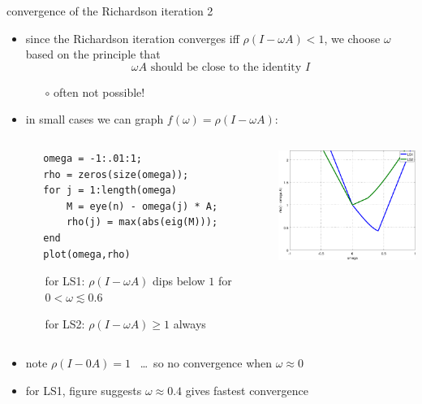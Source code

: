 \documentclass[10pt,hyperref]{beamer}
\begin{document}
\begin{frame}[fragile]{convergence of the Richardson iteration 2}

\begin{itemize}
\item since the Richardson iteration converges iff $\rho(I - \omega A)<1$, we choose $\omega$ based on the principle that
    $$\omega A \text{ should be close to the identity } I$$
\vspace{-5mm}
  \begin{itemize}
  \item[$\circ$] often not possible!
  \end{itemize}

\medskip
\item in small cases we can graph $f(\omega) = \rho(I-\omega A)$:

\medskip
\begin{columns}
\begin{column}{0.5\textwidth}
\footnotesize
\begin{verbatim}
   omega = -1:.01:1;
   rho = zeros(size(omega));
   for j = 1:length(omega)
       M = eye(n) - omega(j) * A;
       rho(j) = max(abs(eig(M)));
   end
   plot(omega,rho)
\end{verbatim}

\smallskip
\begin{itemize}
\footnotesize
\item[for LS1:]  $\rho(I - \omega A)$ dips below $1$ for $0 < \omega \lesssim 0.6$
\item[for LS2:]  $\rho(I - \omega A) \ge 1$ always
\end{itemize}
\end{column}

\begin{column}{0.4\textwidth}
\includegraphics[width=2.0in,keepaspectratio=true]{richardspect}
\end{column}
\end{columns}

\medskip
\item  note $\rho(I-0A)=1$ \, \dots \, so no convergence when $\omega \approx 0$
\item  for LS1, figure suggests $\omega \approx 0.4$ gives fastest convergence
\end{itemize}
\end{frame}
\end{document}
